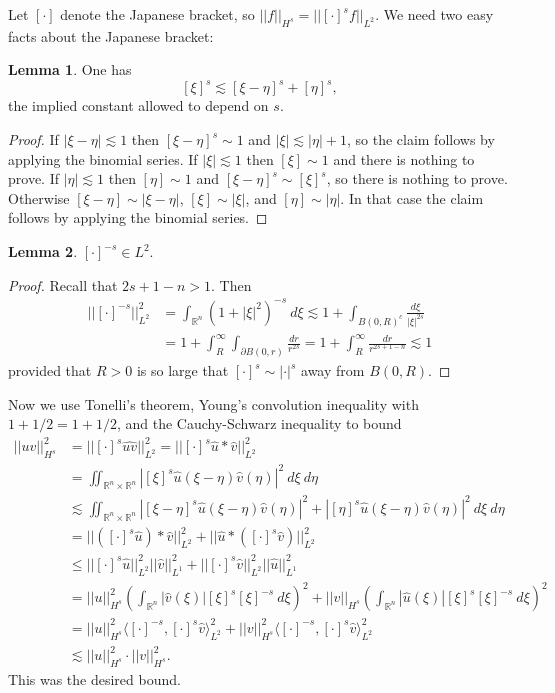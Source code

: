 \documentclass[10pt]{article}
\newcommand{\RR}{\mathbb{R}}
\theoremstyle{definition}
\newtheorem{lemma}{Lemma}[exer]
\begin{document}
Let $[\cdot]$ denote the Japanese bracket, so $||f||_{H^s} = ||[\cdot]^s f||_{L^2}$.
We need two easy facts about the Japanese bracket:
\begin{lemma}
One has
$$[\xi]^s \lesssim [\xi - \eta]^s + [\eta]^s,$$
the implied constant allowed to depend on $s$.
\end{lemma}
\begin{proof}
If $|\xi - \eta| \lesssim 1$ then $[\xi - \eta]^s \sim 1$ and $|\xi| \lesssim |\eta| + 1$, so the claim follows by applying the binomial series.
If $|\xi| \lesssim 1$ then $[\xi] \sim 1$ and there is nothing to prove.
If $|\eta| \lesssim 1$ then $[\eta] \sim 1$ and $[\xi - \eta]^s \sim [\xi]^s$, so there is nothing to prove.
Otherwise $[\xi - \eta] \sim |\xi - \eta|$, $[\xi] \sim |\xi|$, and $[\eta] \sim |\eta|$.
In that case the claim follows by applying the binomial series.
\end{proof}
\begin{lemma}
$[\cdot]^{-s} \in L^2$.
\end{lemma}
\begin{proof}
Recall that $2s + 1 - n > 1$. Then
\begin{align*}
||[\cdot]^{-s}||_{L^2}^2 &= \int_{\RR^n} (1 + |\xi|^2)^{-s}~d\xi \lesssim 1 + \int_{B(0, R)^c} \frac{d\xi}{|\xi|^{2s}}\\
&= 1 + \int_R^\infty \int_{\partial B(0, r)} \frac{dr}{r^{2s}} = 1 + \int_R^\infty \frac{dr}{r^{2s+1-n}} \lesssim 1
\end{align*}
provided that $R > 0$ is so large that $[\cdot]^s \sim |\cdot|^s$ away from $B(0, R)$.
\end{proof}
Now we use Tonelli's theorem, Young's convolution inequality with $1 + 1/2 = 1 + 1/2$, and the Cauchy-Schwarz inequality to bound
\begin{align*}
||uv||_{H^s}^2 &= ||[\cdot]^s \widehat{uv}||_{L^2}^2 = ||[\cdot]^s \hat u * \hat v||_{L^2}^2\\
&= \iint_{\RR^n \times \RR^n} |[\xi]^s \hat u(\xi - \eta) \hat v(\eta)|^2 ~d\xi ~d\eta\\
&\lesssim \iint_{\RR^n \times \RR^n} |[\xi - \eta]^s \hat u(\xi - \eta) \hat v(\eta)|^2 + |[\eta]^s \hat u(\xi - \eta) \hat v(\eta)|^2 ~d\xi ~d\eta\\
&= ||([\cdot]^s \hat u) * \hat v||_{L^2}^2 + ||\hat u * ([\cdot]^s \hat v)||_{L^2}^2\\
&\leq ||[\cdot]^s \hat u||_{L^2}^2 ||\hat v||_{L^1}^2 + ||[\cdot]^s \hat v||_{L^2}^2 ||\hat u||_{L^1}^2\\
&= ||u||_{H^s}^2 \left(\int_{\RR^n} |\hat v(\xi)| [\xi]^s [\xi]^{-s}~d\xi\right)^2 + ||v||_{H^s} \left(\int_{\RR^n} |\hat u(\xi)| [\xi]^s [\xi]^{-s}~d\xi\right)^2\\
&= ||u||_{H^s}^2 \langle [\cdot]^{-s}, [\cdot]^s \hat v\rangle_{L^2}^2 + ||v||_{H^s}^2 \langle [\cdot]^{-s}, [\cdot]^s \hat v\rangle_{L^2}^2\\
&\lesssim ||u||_{H^s}^2 \cdot ||v||_{H^s}^2.
\end{align*}
This was the desired bound.
\end{document}

